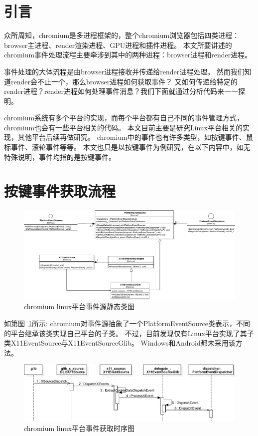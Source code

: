 \section{引言}
众所周知，chromium是多进程框架的，整个chromium浏览器包括四类进程：browser主进程、render渲染进程、GPU进程和插件进程。
本文所要讲述的chromium事件处理流程主要牵涉到其中的两种进程：browser进程和render进程。

事件处理的大体流程是由browser进程接收并传递给render进程处理。
然而我们知道render会不止一个，那么browser进程如何获取事件？
又如何传递给特定的render进程？render进程如何处理事件消息？我们下面就通过分析代码来一一探明。

chromium系统有多个平台的实现，而每个平台都有自己不同的事件管理方式，chromium也会有一些平台相关的代码。
本文目前主要是研究Linux平台相关的实现，其他平台后续再做研究。
chromium中的事件也有许多类型，如按键事件、鼠标事件、滚轮事件等等。
本文也只是以按键事件为例研究，在以下内容中，如无特殊说明，事件均指的是按键事件。

\section{按键事件获取流程}
\begin{figure}[H] 
  \centering 
  \includegraphics[width=\textwidth]{image/event_study/linux_event_source_class.pdf} 
  \caption{chromium linux平台事件源静态类图} \label{fig:linux_event_source_class} 
\end{figure}

如第图~\ref{fig:linux_event_source_class}所示:
chromium对事件源抽象了一个PlatformEventSource类表示，不同的平台继承该类实现自己平台的子类。
不过，目前发现仅有Linux平台实现了其子类X11EventSource与X11EventSourceGlib。
Windows和Android都未采用该方法。

\begin{figure}[H] 
  \centering 
  \includegraphics[width=\textwidth]{image/event_study/linux_get_event_from_source.pdf} 
  \caption{chromium linux平台事件获取时序图} \label{fig:linux_get_event_from_source} 
\end{figure}

